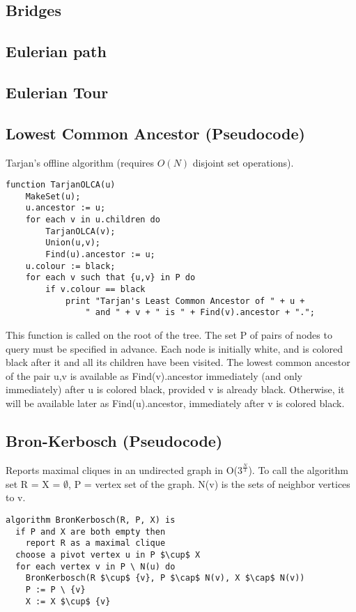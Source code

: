 \documentclass[9pt]{extarticle}
\begin{document}
\begin{multicols*}{3}
\subsection{Bridges} %


\subsection{Eulerian path}


\subsection{Eulerian Tour}


\subsection{Lowest Common Ancestor (Pseudocode)} %
Tarjan's offline algorithm (requires $O(N)$ disjoint set operations).
\begin{lstlisting}
function TarjanOLCA(u)
    MakeSet(u);
    u.ancestor := u;
    for each v in u.children do
        TarjanOLCA(v);
        Union(u,v);
        Find(u).ancestor := u;
    u.colour := black;
    for each v such that {u,v} in P do
        if v.colour == black
            print "Tarjan's Least Common Ancestor of " + u +
                " and " + v + " is " + Find(v).ancestor + ".";
\end{lstlisting}
This function is called on the root of the tree. The set P of pairs of nodes to
query must be specified in advance. Each node is initially white, and is
colored black after it and all its children have been visited. The lowest
common ancestor of the pair {u,v} is available as Find(v).ancestor immediately
(and only immediately) after u is colored black, provided v is already black.
Otherwise, it will be available later as Find(u).ancestor, immediately after v
is colored black.

\subsection{Bron-Kerbosch (Pseudocode)}
Reports maximal cliques in an undirected graph in O($3^{\frac{N}{3}}$).
To call the algorithm set R = X = $\emptyset$, P = vertex set of the graph.
N(v) is the sets of neighbor vertices to v.
\begin{lstlisting}[mathescape=true]
algorithm BronKerbosch(R, P, X) is
  if P and X are both empty then
    report R as a maximal clique
  choose a pivot vertex u in P $\cup$ X
  for each vertex v in P \ N(u) do
    BronKerbosch(R $\cup$ {v}, P $\cap$ N(v), X $\cap$ N(v))
    P := P \ {v}
    X := X $\cup$ {v}
\end{lstlisting}


\end{multicols*}
\end{document}
